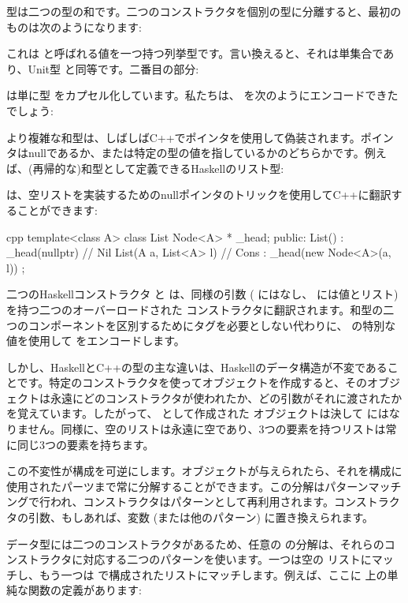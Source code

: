  型は二つの型の和です。二つのコンストラクタを個別の型に分離すると、最初のものは次のようになります: 

これは  と呼ばれる値を一つ持つ列挙型です。言い換えると、それは単集合であり、Unit型 \code{()} と同等です。二番目の部分: 

は単に型  をカプセル化しています。私たちは、 を次のようにエンコードできたでしょう: 

より複雑な和型は、しばしばC++でポインタを使用して偽装されます。ポインタはnullであるか、または特定の型の値を指しているかのどちらかです。例えば、(再帰的な)和型として定義できるHaskellのリスト型: 

は、空リストを実装するためのnullポインタのトリックを使用してC++に翻訳することができます: 

\begin{snip}{cpp}
template<class A>
class List { 
    Node<A> * _head;
public:
    List() : _head(nullptr) {} // Nil
    List(A a, List<A> l)       // Cons
      : _head(new Node<A>(a, l))
    {}
};
\end{snip}
二つのHaskellコンストラクタ  と  は、同様の引数 ( にはなし、 には値とリスト) を持つ二つのオーバーロードされた  コンストラクタに翻訳されます。和型の二つのコンポーネントを区別するためにタグを必要としない代わりに、  の特別な  値を使用して  をエンコードします。

しかし、HaskellとC++の型の主な違いは、Haskellのデータ構造が不変であることです。特定のコンストラクタを使ってオブジェクトを作成すると、そのオブジェクトは永遠にどのコンストラクタが使われたか、どの引数がそれに渡されたかを覚えています。したがって、  として作成された  オブジェクトは決して  にはなりません。同様に、空のリストは永遠に空であり、3つの要素を持つリストは常に同じ3つの要素を持ちます。

この不変性が構成を可逆にします。オブジェクトが与えられたら、それを構成に使用されたパーツまで常に分解することができます。この分解はパターンマッチングで行われ、コンストラクタはパターンとして再利用されます。コンストラクタの引数、もしあれば、変数 (または他のパターン) に置き換えられます。

 データ型には二つのコンストラクタがあるため、任意の  の分解は、それらのコンストラクタに対応する二つのパターンを使います。一つは空の  リストにマッチし、もう一つは  で構成されたリストにマッチします。例えば、ここに  上の単純な関数の定義があります: 

